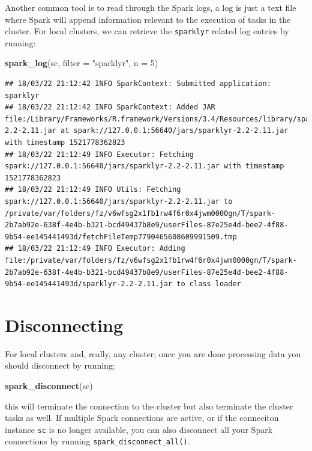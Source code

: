 \documentclass[]{book}
\newenvironment{Shaded}{\begin{snugshade}}{\end{snugshade}}
\newcommand{\KeywordTok}[1]{\textcolor[rgb]{0.13,0.29,0.53}{\textbf{#1}}}
\newcommand{\DataTypeTok}[1]{\textcolor[rgb]{0.13,0.29,0.53}{#1}}
\newcommand{\DecValTok}[1]{\textcolor[rgb]{0.00,0.00,0.81}{#1}}
\newcommand{\StringTok}[1]{\textcolor[rgb]{0.31,0.60,0.02}{#1}}
\newcommand{\NormalTok}[1]{#1}
\theoremstyle{definition}
\theoremstyle{definition}
\theoremstyle{definition}
\theoremstyle{remark}
\begin{document}
Another common tool is to read through the Spark logs, a log is just a
text file where Spark will append information relevant to the execution
of tasks in the cluster. For local clusters, we can retrieve the
\texttt{sparklyr} related log entries by running:

\begin{Shaded}
\begin{Highlighting}[]
\KeywordTok{spark_log}\NormalTok{(sc, }\DataTypeTok{filter =} \StringTok{"sparklyr"}\NormalTok{, }\DataTypeTok{n =} \DecValTok{5}\NormalTok{)}
\end{Highlighting}
\end{Shaded}

\begin{verbatim}
## 18/03/22 21:12:42 INFO SparkContext: Submitted application: sparklyr
## 18/03/22 21:12:42 INFO SparkContext: Added JAR file:/Library/Frameworks/R.framework/Versions/3.4/Resources/library/sparklyr/java/sparklyr-2.2-2.11.jar at spark://127.0.0.1:56640/jars/sparklyr-2.2-2.11.jar with timestamp 1521778362823
## 18/03/22 21:12:49 INFO Executor: Fetching spark://127.0.0.1:56640/jars/sparklyr-2.2-2.11.jar with timestamp 1521778362823
## 18/03/22 21:12:49 INFO Utils: Fetching spark://127.0.0.1:56640/jars/sparklyr-2.2-2.11.jar to /private/var/folders/fz/v6wfsg2x1fb1rw4f6r0x4jwm0000gn/T/spark-2b7ab92e-638f-4e4b-b321-bcd49437b8e9/userFiles-87e25e4d-bee2-4f88-9b54-ee145441493d/fetchFileTemp7790465608609991509.tmp
## 18/03/22 21:12:49 INFO Executor: Adding file:/private/var/folders/fz/v6wfsg2x1fb1rw4f6r0x4jwm0000gn/T/spark-2b7ab92e-638f-4e4b-b321-bcd49437b8e9/userFiles-87e25e4d-bee2-4f88-9b54-ee145441493d/sparklyr-2.2-2.11.jar to class loader
\end{verbatim}

\section{Disconnecting}\label{disconnecting}

For local clusters and, really, any cluster; once you are done
processing data you should disconnect by running:

\begin{Shaded}
\begin{Highlighting}[]
\KeywordTok{spark_disconnect}\NormalTok{(sc)}
\end{Highlighting}
\end{Shaded}

this will terminate the connection to the cluster but also terminate the
cluster tasks as well. If multiple Spark connections are active, or if
the conneciton instance \texttt{sc} is no longer available, you can also
disconnect all your Spark connections by running
\texttt{spark\_disconnect\_all()}.
\end{document}
